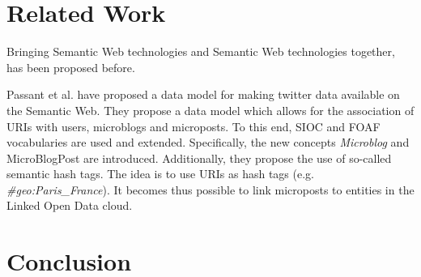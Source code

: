 \documentclass{llncs}
\begin{document}
\section{Related Work}

Bringing Semantic Web technologies and Semantic Web technologies together, has been proposed before.

Passant et al. \cite{key:smob} have proposed a data model for making twitter
data available on the Semantic Web. They propose a data model which allows for the association of URIs with users, microblogs and microposts. To this end, SIOC and FOAF vocabularies are used and extended. Specifically, the new concepts \emph{Microblog} and {MicroBlogPost} are introduced. Additionally, they propose the use of so-called semantic hash tags. The idea is to use URIs as hash tags (e.g. \emph{\#geo:Paris\_France}). It becomes thus possible to link microposts to entities in the Linked Open Data cloud.
\section{Conclusion}







\end{document}
